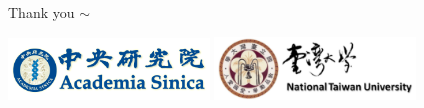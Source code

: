 \documentclass[compress]{beamer}
\begin{document}

\begin{frame}

\begin{center}{
  \Huge Thank you $\sim$

\hfill

\hfill \includegraphics[width=0.4\textwidth]{img/ASlogoLetterGIF.png}
\hfill \includegraphics[width=0.4\textwidth]{img/ntu.png} \hfill
}

\end{center}
\end{frame}
\end{document}
